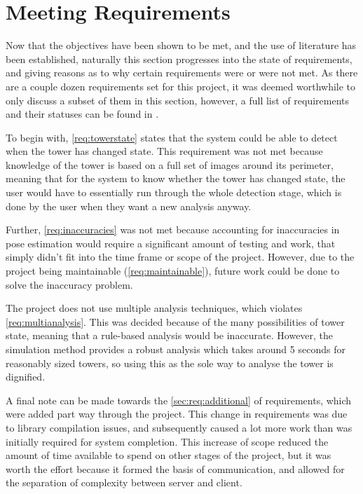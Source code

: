 \section{Meeting Requirements}

Now that the objectives have been shown to be met, and the use of literature has been established, naturally this section progresses into the state of requirements, and giving reasons as to why certain requirements were or were not met. As there are a couple dozen requirements set for this project, it was deemed worthwhile to only discuss a subset of them in this section, however, a full list of requirements and their statuses can be found in .

To begin with, \cref{req:towerstate} states that the system could be able to detect when the tower has changed state. This requirement was not met because knowledge of the tower is based on a full set of images around its perimeter, meaning that for the system to know whether the tower has changed state, the user would have to essentially run through the whole detection stage, which is done by the user when they want a new analysis anyway.

Further, \cref{req:inaccuracies} was not met because accounting for inaccuracies in pose estimation would require a significant amount of testing and work, that simply didn't fit into the time frame or scope of the project. However, due to the project being maintainable (\cref{req:maintainable}), future work could be done to solve the inaccuracy problem.

The project does not use multiple analysis techniques, which violates \cref{req:multianalysis}. This was decided because of the many possibilities of tower state, meaning that a rule-based analysis would be inaccurate. However, the simulation method provides a robust analysis which takes around 5 seconds for reasonably sized towers, so using this as the sole way to analyse the tower is dignified.

A final note can be made towards the \cref{sec:req:additional} of requirements, which were added part way through the project. This change in requirements was due to library compilation issues, and subsequently caused a lot more work than was initially required for system completion. This increase of scope reduced the amount of time available to spend on other stages of the project, but it was worth the effort because it formed the basis of communication, and allowed for the separation of complexity between server and client.

